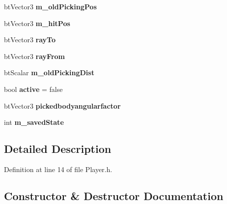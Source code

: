 \begin{DoxyCompactItemize}
\item 
bt\+Vector3 {\bfseries m\+\_\+old\+Picking\+Pos}\hypertarget{class_game_1_1_player_ad4eeee281483e943d3a55fb2e81968f5}{}\label{class_game_1_1_player_ad4eeee281483e943d3a55fb2e81968f5}

\item 
bt\+Vector3 {\bfseries m\+\_\+hit\+Pos}\hypertarget{class_game_1_1_player_a38c5edc61c6c665d74faaa442111e128}{}\label{class_game_1_1_player_a38c5edc61c6c665d74faaa442111e128}

\item 
bt\+Vector3 {\bfseries ray\+To}\hypertarget{class_game_1_1_player_a4e94f12311fd385bd149593ef4fcac11}{}\label{class_game_1_1_player_a4e94f12311fd385bd149593ef4fcac11}

\item 
bt\+Vector3 {\bfseries ray\+From}\hypertarget{class_game_1_1_player_a232e8cd88d87fe31d27feee2c74fd127}{}\label{class_game_1_1_player_a232e8cd88d87fe31d27feee2c74fd127}

\item 
bt\+Scalar {\bfseries m\+\_\+old\+Picking\+Dist}\hypertarget{class_game_1_1_player_a10e436f1af96276e01ca10446bf635ce}{}\label{class_game_1_1_player_a10e436f1af96276e01ca10446bf635ce}

\item 
bool {\bfseries active} = false\hypertarget{class_game_1_1_player_acc9490f5bb7b108508fb01a92840edf4}{}\label{class_game_1_1_player_acc9490f5bb7b108508fb01a92840edf4}

\item 
bt\+Vector3 {\bfseries pickedbodyangularfactor}\hypertarget{class_game_1_1_player_a18c9903af68407a2dc69ff79a572dfd3}{}\label{class_game_1_1_player_a18c9903af68407a2dc69ff79a572dfd3}

\item 
int {\bfseries m\+\_\+saved\+State}\hypertarget{class_game_1_1_player_ac926f7f93b598968a3ffa845d7e10853}{}\label{class_game_1_1_player_ac926f7f93b598968a3ffa845d7e10853}

\end{DoxyCompactItemize}


\subsection{Detailed Description}


Definition at line 14 of file Player.\+h.



\subsection{Constructor \& Destructor Documentation}
